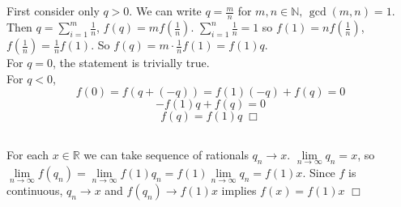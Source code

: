 \documentclass{article}
\begin{document}
\subsection{}
First consider only $q>0$. We can write $q = \frac{m}{n}$ for $m,n \in \mathbb{N},\, \gcd(m,n) = 1$. Then $q = \sum\limits_{i=1}^{m} \frac{1}{n}$, $f(q) = mf(\frac{1}{n})$. $\sum\limits_{i=1}^{n} \frac{1}{n} = 1$ so $f(1) = nf(\frac{1}{n})$, $f(\frac{1}{n}) = \frac{1}{n} f(1)$. So $f(q) = m\cdot \frac{1}{n}f(1) = f(1)q$.\\
For $q = 0$, the statement is trivially true.\\
For $q<0$,
$$f(0) = f(q + (-q)) = f(1)(-q) + f(q) = 0$$
$$-f(1)q + f(q) = 0$$
$$f(q) = f(1)q \; \Box$$

\subsection{}
For each $x\in \mathbb{R}$ we can take sequence of rationals $q_n \rightarrow x$. $\lim\limits_{n \rightarrow \infty} q_n = x$, so $\lim\limits_{n \rightarrow \infty} f(q_n) = \lim\limits_{n \rightarrow \infty} f(1)q_n = f(1) \lim\limits_{n \rightarrow \infty} q_n = f(1)x$. Since $f$ is continuous, $q_n \rightarrow x$ and $f(q_n) \rightarrow f(1)x$ implies $f(x) = f(1)x$ $\Box$
\end{document}
